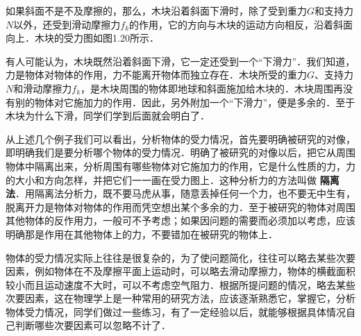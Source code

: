 如果斜面不是不及摩擦的，那么，木块沿着斜面下滑时，除了受到重力$G$和支持力$N$以外，还受到滑动摩擦力$f_k$的作用，它的方向与木块的运动方向相反，沿着斜面向上．木块的受力图如图1.20所示．

有人可能认为，木块既然沿着斜面下滑，它一定还受到一个“下滑力”．我们知道，力是物体对物体的作用，力不能离开物体而独立存在．木块所受的重力$G$、支持力$N$和滑动摩擦力$f_k$，是木块周围的物体即地球和斜面施加给木块的．木块周围再没有别的物体对它施加力的作用．因此，另外附加一个“下滑力”，便是多余的．至于木块为什么下滑，同学们学到后面就会明白了．

从上述几个例子我们可以看出，分析物体的受力情况，首先要明确被研究的对像，即明确我们是要分析哪个物体的受力情况．明确了被研究的对像以后，把它从周围物体中隔离出来，分析周围有哪些物体对它施加力的作用，它是什么性质的力，力的大小和方向怎样，并把它们一一画在受力图上．这种分析力的方法叫做\textbf{ 隔离法}．用隔离法分析力，既不要马虎从事，随意丢掉任何一个力，也不要无中生有，脱离开力是物体对物体的作用而凭空想出某个多余的力．至于被研究的物体对周围其他物体的反作用力，一般可不予考虑；如果因问题的需要而必须加以考虑，应该明确那是作用在其他物体上的力，不要错加在被研究的物体上．

物体的受力情况实际上往往是很复杂的，为了使问题简化，往往可以略去某些次要因素，例如物体在不及摩擦平面上运动时，可以略去滑动摩擦力，物体的横截面积较小而且运动速度不大时，可以不考虑空气阻力．根据所提问题的情况，略去某些次要因素，这在物理学上是一种常用的研究方法，应该逐渐熟悉它，掌握它，分析物体受力情况，同学们做过一些练习，有了一定经验以后，就能够根据具体情况自己判断哪些次要因素可以忽略不计了．

